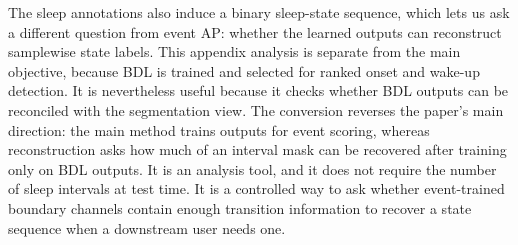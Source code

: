 The sleep annotations also induce a binary sleep-state sequence, which lets us ask a different question from event AP: whether the learned outputs can reconstruct samplewise state labels.
This appendix analysis is separate from the main objective, because BDL is trained and selected for ranked onset and wake-up detection.
It is nevertheless useful because it checks whether BDL outputs can be reconciled with the segmentation view.
The conversion reverses the paper's main direction: the main method trains outputs for event scoring, whereas reconstruction asks how much of an interval mask can be recovered after training only on BDL outputs.
It is an analysis tool, and it does not require the number of sleep intervals at test time.
It is a controlled way to ask whether event-trained boundary channels contain enough transition information to recover a state sequence when a downstream user needs one.

